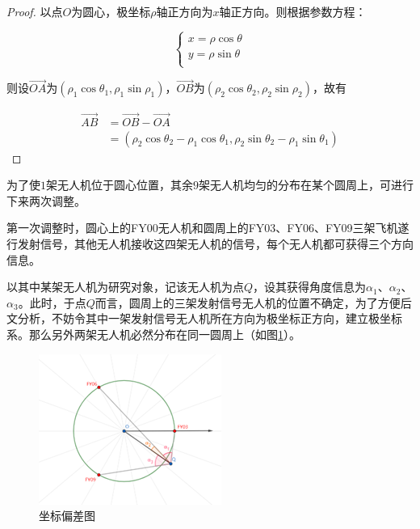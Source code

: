 \begin{proof}
    以点$O$为圆心，极坐标$\rho$轴正方向为$x$轴正方向。则根据参数方程：

    \begin{equation*}
        \begin{cases}
            x = \rho\cos\theta\\
            y = \rho\sin\theta\\
        \end{cases}
    \end{equation*}

    则设$\overrightarrow{OA}$为$(\rho_1\cos\theta_1, \rho_1\sin\rho_1)$，$\overrightarrow{OB}$为$(\rho_2\cos\theta_2, \rho_2\sin\rho_2)$，故有

    \begin{equation}
        \begin{aligned}
            \overrightarrow{AB} &= \overrightarrow{OB} - \overrightarrow{OA} \\
            &=(\rho_2\cos\theta_2 - \rho_1\cos\theta_1, \rho_2\sin\theta_2 - \rho_1\sin\theta_1)
        \end{aligned}
    \end{equation}
\end{proof}

为了使$1$架无人机位于圆心位置，其余$9$架无人机均匀的分布在某个圆周上，可进行下来两次调整。

第一次调整时，圆心上的FY00无人机和圆周上的FY03、FY06、FY09三架飞机遂行发射信号，其他无人机接收这四架无人机的信号，每个无人机都可获得三个方向信息。

以其中某架无人机为研究对象，记该无人机为点$Q$，设其获得角度信息为$\alpha_1$、$\alpha_2$、$\alpha_3$。此时，于点$Q$而言，圆周上的三架发射信号无人机的位置不确定，为了方便后文分析，不妨令其中一架发射信号无人机所在方向为极坐标正方向，建立极坐标系。那么另外两架无人机必然分布在同一圆周上（如图\ref{figure111930}）。

\begin{figure}[h]
    \centering
    \includegraphics{res/figure111930.png}
    \caption{坐标偏差图}
    \label{figure111930}    %
\end{figure}

